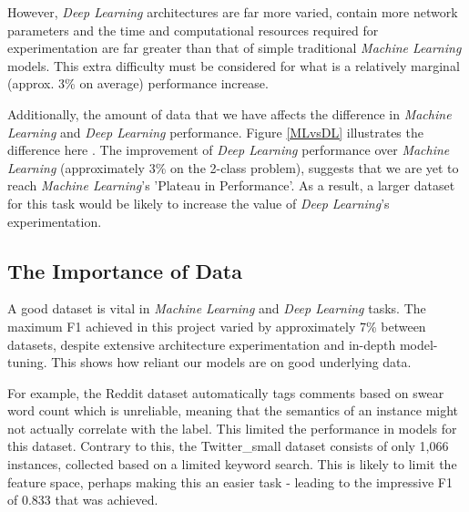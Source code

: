 \documentclass[12pt,a4paper]{article}
\begin{document}
However, \textit{Deep Learning} architectures are far more varied, contain more network parameters and the time and computational resources required for experimentation are far greater than that of simple traditional \textit{Machine Learning} models. This extra difficulty must be considered for what is a relatively marginal (approx. 3\% on average) performance increase.

Additionally, the amount of data that we have affects the difference in \textit{Machine Learning} and \textit{Deep Learning} performance. Figure \ref{MLvsDL} illustrates the difference here \cite{BuildDeeper}. The improvement of \textit{Deep Learning} performance over \textit{Machine Learning} (approximately 3\% on the 2-class problem), suggests that we are yet to reach \textit{Machine Learning}'s 'Plateau in Performance'. As a result, a larger dataset for this task would be likely to increase the value of \textit{Deep Learning}'s experimentation.


\subsection{The Importance of Data}

A good dataset is vital in \textit{Machine Learning} and \textit{Deep Learning} tasks. The maximum F1 achieved in this project varied by approximately 7\% between datasets, despite extensive architecture experimentation and in-depth model-tuning. This shows how reliant our models are on good underlying data. 

For example, the Reddit dataset automatically tags comments based on swear word count which is unreliable, meaning that the semantics of an instance might not actually correlate with the label. This limited the performance in models for this dataset. Contrary to this, the Twitter\_small dataset consists of only 1,066 instances, collected based on a limited keyword search. This is likely to limit the feature space, perhaps making this an easier task - leading to the impressive F1 of 0.833 that was achieved.
\end{document}
